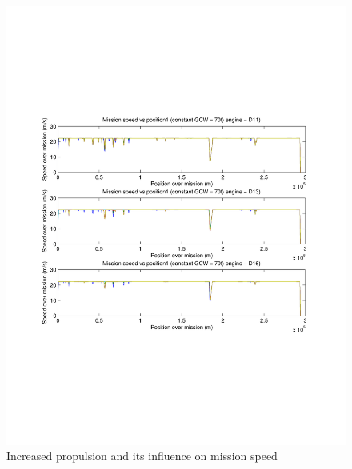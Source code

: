 \documentclass{article}
\begin{document}
\begin{figure}[h!]
\centering
\includegraphics[width=\linewidth, clip=true, trim=45 185 65 200]{Figures/Increasing_number_of_axles/Mission_speed_vs_position_(constant_GCW=70t).pdf}
\caption{Increased propulsion and its influence on mission speed}
\label{globalMissionSpeedIncreasedPropulsion}
\end{figure}
\end{document}
